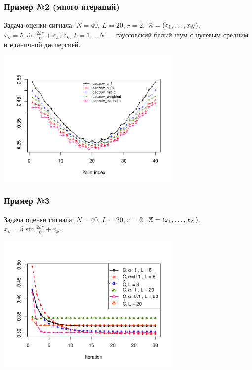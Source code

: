 \documentclass[unicode, notheorems]{beamer}
\begin{document}
\begin{frame}
	\frametitle{Пример №2 (много итераций)}
	Задача оценки сигнала: $N = 40$, $L = 20$, $r = 2$, $\mathbb{X} = (x_{1}, \ldots, x_N),$  $x_k = 5\sin{\frac{2 k \pi}{6}} + \varepsilon_k$; $\varepsilon_k$, $k = 1, \ldots N$ --- гауссовский белый шум с нулевым средним и единичной дисперсией.
	\vspace{-0.8cm}
	
	\begin{center}
		\includegraphics*[width = 9cm]{s1_it100.pdf}
	\end{center}
	
\end{frame}

\begin{frame}
	\frametitle{Пример №3}
	Задача оценки сигнала: $N = 40$, $L = 20$, $r = 2$, $\mathbb{X} = (x_{1}, \ldots, x_N),$  $x_k = 5\sin{\frac{2 k \pi}{6}} + \varepsilon_k$.
	
	\begin{center}
		\includegraphics*[width = 9cm]{cadzowspeed_2.pdf}
	\end{center}
\end{frame}
\end{document}
